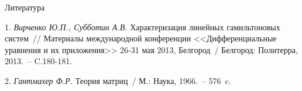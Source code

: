 \centerline{Литература}\nopagebreak

1. {\it Вирченко Ю.П., Субботин А.В.}  Характеризация линейных гамильтоновых систем~// Материалы международной конференции <<Дифференциальные уравнения и их приложения>> 26-31 мая 2013, Белгород~/ Белгород: Политерра, 2013.~-- C.180-181.

2. {\it Гантмахер Ф.Р.} Теория матриц~/ М.: Наука, 1966.~-- 576~c.




